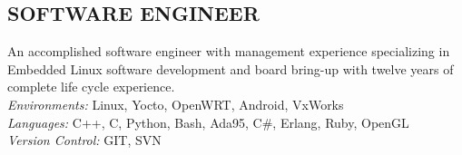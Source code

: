\documentclass[line]{res}
\begin{document}
\address{San Mateo, CA}
\address{mathew.prokos@gmail.com}

\begin{resume}
\section{SOFTWARE ENGINEER}
    \vspace{1mm}
    An accomplished software engineer with management experience specializing in Embedded Linux software
development and board bring-up with twelve years of complete life cycle experience.\\

    \vspace{-5mm}
    {\sl Environments:} Linux, Yocto, OpenWRT, Android, VxWorks\\
    {\sl Languages:} C++, C, Python, Bash, Ada95, C\#, Erlang, Ruby, OpenGL\\
    {\sl Version Control:} GIT, SVN\\
\vspace{-5mm}

\end{resume}
\end{document}
